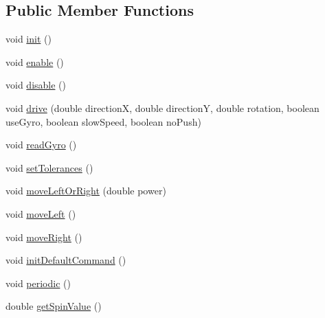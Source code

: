 \subsection*{Public Member Functions}
\begin{DoxyCompactItemize}
\item 
void \mbox{\hyperlink{classorg_1_1usfirst_1_1frc3707_1_1_creedence_1_1subsystems_1_1_drive_train_a44d6db76496727831b99961ff9fa622f}{init}} ()
\item 
void \mbox{\hyperlink{classorg_1_1usfirst_1_1frc3707_1_1_creedence_1_1subsystems_1_1_drive_train_a31349bde0f794f11ed737f92a5e92c97}{enable}} ()
\item 
void \mbox{\hyperlink{classorg_1_1usfirst_1_1frc3707_1_1_creedence_1_1subsystems_1_1_drive_train_a492a2baf7f63ea3db90dd2608220c0af}{disable}} ()
\item 
void \mbox{\hyperlink{classorg_1_1usfirst_1_1frc3707_1_1_creedence_1_1subsystems_1_1_drive_train_a031616877c101a96e107705b01027032}{drive}} (double directionX, double directionY, double rotation, boolean use\+Gyro, boolean slow\+Speed, boolean no\+Push)
\item 
void \mbox{\hyperlink{classorg_1_1usfirst_1_1frc3707_1_1_creedence_1_1subsystems_1_1_drive_train_a4b7b4e43b7cdbdcad9ebc8434b3b3dd5}{read\+Gyro}} ()
\item 
void \mbox{\hyperlink{classorg_1_1usfirst_1_1frc3707_1_1_creedence_1_1subsystems_1_1_drive_train_a17d2e7177847272a04ea3391dc56176c}{set\+Tolerances}} ()
\item 
void \mbox{\hyperlink{classorg_1_1usfirst_1_1frc3707_1_1_creedence_1_1subsystems_1_1_drive_train_aa9afbafaafe780ed7ca59d60a67a6629}{move\+Left\+Or\+Right}} (double power)
\item 
void \mbox{\hyperlink{classorg_1_1usfirst_1_1frc3707_1_1_creedence_1_1subsystems_1_1_drive_train_a1477ebe4464af5feaf76a67513a9063d}{move\+Left}} ()
\item 
void \mbox{\hyperlink{classorg_1_1usfirst_1_1frc3707_1_1_creedence_1_1subsystems_1_1_drive_train_a42e63c6914b8fb47374339004cfbd229}{move\+Right}} ()
\item 
void \mbox{\hyperlink{classorg_1_1usfirst_1_1frc3707_1_1_creedence_1_1subsystems_1_1_drive_train_acb736019b9ca7d8c15f9ed260ad70543}{init\+Default\+Command}} ()
\item 
void \mbox{\hyperlink{classorg_1_1usfirst_1_1frc3707_1_1_creedence_1_1subsystems_1_1_drive_train_a9c6e1c93fe48fb89c2c57f11653a4827}{periodic}} ()
\item 
double \mbox{\hyperlink{classorg_1_1usfirst_1_1frc3707_1_1_creedence_1_1subsystems_1_1_drive_train_acd013f12431a4d3b05e36e35a966e244}{get\+Spin\+Value}} ()

\end{DoxyCompactItemize}
